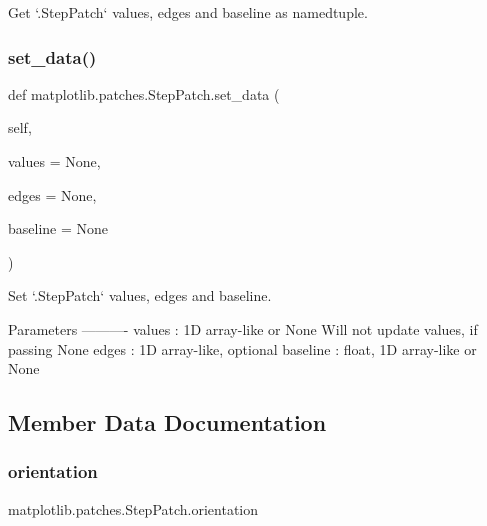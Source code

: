\begin{DoxyVerb}Get `.StepPatch` values, edges and baseline as namedtuple.\end{DoxyVerb}
 \mbox{\label{classmatplotlib_1_1patches_1_1StepPatch_a4e91e15ebca84eb49374321a251af2e1}} 
\subsubsection{\texorpdfstring{set\+\_\+data()}{set\_data()}}
{\footnotesize\ttfamily def matplotlib.\+patches.\+Step\+Patch.\+set\+\_\+data (\begin{DoxyParamCaption}\item[{}]{self,  }\item[{}]{values = {\ttfamily None},  }\item[{}]{edges = {\ttfamily None},  }\item[{}]{baseline = {\ttfamily None} }\end{DoxyParamCaption})}

\begin{DoxyVerb}Set `.StepPatch` values, edges and baseline.

Parameters
----------
values : 1D array-like or None
    Will not update values, if passing None
edges : 1D array-like, optional
baseline : float, 1D array-like or None
\end{DoxyVerb}
 

\subsection{Member Data Documentation}
\mbox{\label{classmatplotlib_1_1patches_1_1StepPatch_abfc1efe4f3879c17a1275c841faf0ecc}} 
\subsubsection{\texorpdfstring{orientation}{orientation}}
{\footnotesize\ttfamily matplotlib.\+patches.\+Step\+Patch.\+orientation}

